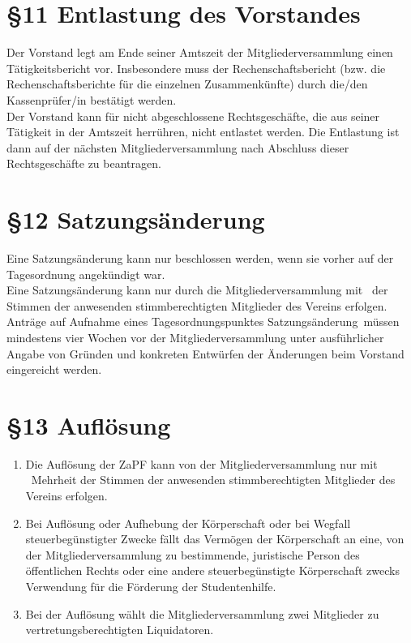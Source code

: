 \documentclass[ngerman]{article}
\begin{document}
\section*{§11 Entlastung des Vorstandes}
Der Vorstand legt am Ende seiner Amtszeit der Mitgliederversammlung einen Tätigkeitsbericht vor.
Insbesondere muss der Rechenschaftsbericht (bzw. die Rechenschaftsberichte für die einzelnen Zusammenkünfte) durch die/den Kassenprüfer/in bestätigt werden.\\
Der Vorstand kann für nicht abgeschlossene Rechtsgeschäfte, die aus seiner Tätigkeit in der Amtszeit herrühren, nicht entlastet werden. Die Entlastung ist dann auf der nächsten Mitgliederversammlung nach Abschluss dieser Rechtsgeschäfte zu beantragen.


\section*{§12 Satzungsänderung}
Eine Satzungsänderung kann nur beschlossen werden, wenn sie vorher auf der Tagesordnung angekündigt war.\\
Eine Satzungsänderung kann nur durch die Mitgliederversammlung mit \ der Stimmen der anwesenden stimmberechtigten Mitglieder des Vereins erfolgen.\\
Anträge auf Aufnahme eines Tagesordnungspunktes \glqq Satzungsänderung\grqq\ müssen mindestens vier Wochen vor der Mitgliederversammlung unter ausführlicher Angabe von Gründen und konkreten Entwürfen der Änderungen beim Vorstand eingereicht werden.


\section*{§13 Auflösung}
\begin{enumerate}
 \item Die Auflösung der ZaPF kann von der Mitgliederversammlung nur mit \ Mehrheit der Stimmen der anwesenden stimmberechtigten Mitglieder des Vereins erfolgen.
 \item Bei Auflösung oder Aufhebung der Körperschaft oder bei Wegfall steuerbegünstigter Zwecke fällt das Vermögen der Körperschaft an eine, von der Mitgliederversammlung zu bestimmende, juristische Person des öffentlichen Rechts oder eine andere steuerbegünstigte Körperschaft zwecks Verwendung für die Förderung der Studentenhilfe.
 \item Bei der Auflösung wählt die Mitgliederversammlung zwei Mitglieder zu vertretungsberechtigten Liquidatoren.
\end{enumerate}
\end{document}
